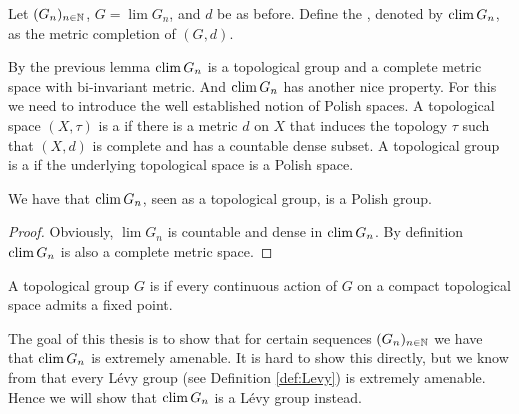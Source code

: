 \begin{definition}
Let $(G_n)_{n\in\mathbb{N}}$, $G=\lim G_n$, and $d$ be as before. Define the , denoted by $\operatorname{clim} G_n$, as the metric completion of $(G,d)$.
\end{definition}
By the previous lemma $\operatorname{clim} G_n$ is a topological group and a complete metric space with bi-invariant metric. 
And $\operatorname{clim} G_n$ has another nice property. For this we need to introduce the well established notion of Polish spaces. A topological space $(X,\tau)$ is a  if there is a metric $d$ on $X$ that induces the topology $\tau$ such that $(X,d)$ is complete and has a countable dense subset. A topological group is a  if the underlying topological space is a Polish space.

\begin{lemma}\label{lem:climIsPolish}
We have that $\operatorname{clim} G_n$, seen as a topological group, is a Polish group.
\end{lemma}
\begin{proof}
Obviously, $\lim G_n$ is countable and dense in $\operatorname{clim} G_n$. By definition $\operatorname{clim} G_n$ is also a complete metric space.
\end{proof}

\begin{definition}
A topological group $G$ is  if every continuous action of $G$ on a compact topological space admits a fixed point.
\end{definition}

The goal of this thesis is to show that for certain sequences $(G_n)_{n\in\mathbb{N}}$ we have that $\operatorname{clim} G_n$ is extremely amenable. It is hard to show this directly, but we know from \cite{Levy} that every L\'evy group (see Definition \ref{def:Levy}) is extremely amenable. Hence we will show that $\operatorname{clim} G_n$ is a L\'evy group instead.




